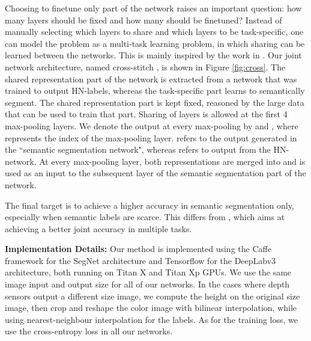 Choosing to finetune only part of the network raises an important question: how many layers should be fixed and how many should be finetuned? Instead of manually selecting which layers to share and which layers to be task-specific, one can model the problem as a multi-task learning problem, in which sharing can be learned between the networks. This is mainly inspired by the work in \cite{misra2016cross}. Our joint network architecture, named cross-stitch \cite{misra2016cross}, is shown in Figure \ref{fig:cross}. The shared representation part of the network is extracted from a network that was trained to output HN-labels, whereas the task-specific part learns to semantically segment. The shared representation part is kept fixed, reasoned by the large data that can be used to train that part. Sharing of layers is allowed at the first 4 max-pooling layers. We denote the output at every max-pooling by  and , where  represents the index of the max-pooling layer.  refers to the output generated in the ``semantic segmentation network", whereas  refers to output from the HN-network. At every max-pooling layer, both representations are merged into  and  is used as an input to the subsequent layer of the semantic segmentation part of the network.

The final target is to achieve a higher accuracy in semantic segmentation only, especially when semantic labels are scarce. This differs from \cite{misra2016cross}, which aims at achieving a better joint accuracy in multiple tasks.


\noindent \textbf{Implementation Details: } Our method is implemented using the Caffe framework \cite{jia2014caffe} for the SegNet architecture and Tensorflow \cite{abadi2016tensorflow} for the DeepLabv3 architecture, both running on Titan X and Titan Xp GPUs. We use the same image input and output size for all of our networks. In the cases where depth sensors output a different size image, we compute the height on the original size image, then crop and reshape the color image with bilinear interpolation, while using nearest-neighbour interpolation for the labels. As for the training loss, we use the cross-entropy loss \cite{long2015fully} in all our networks. 




